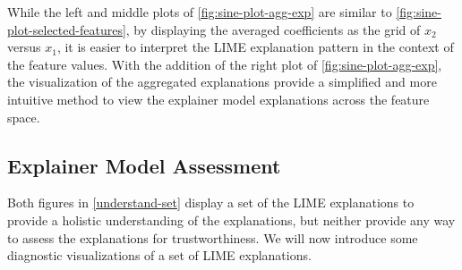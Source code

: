 \documentclass[AMS,STIX2COL]{WileyNJD-v2}\usepackage[]{graphicx}\usepackage[]{color}
\begin{document}
{While the left and middle plots of \autoref{fig:sine-plot-agg-exp} are similar to \autoref{fig:sine-plot-selected-features}, by displaying the averaged coefficients as the grid of $x_2$ versus $x_1$, it is easier to interpret the LIME explanation pattern in the context of the feature values. With the addition of the right plot of \autoref{fig:sine-plot-agg-exp}, the visualization of the aggregated explanations provide a simplified and more intuitive method to view the explainer model explanations across the feature space.



\subsection{Explainer Model Assessment} \label{assess-set}



Both figures in \autoref{understand-set} display a set of the LIME explanations to provide a holistic understanding of the explanations, but neither provide any way to assess the explanations for trustworthiness. We will now introduce some diagnostic visualizations of a set of LIME explanations.

}
\end{document}
